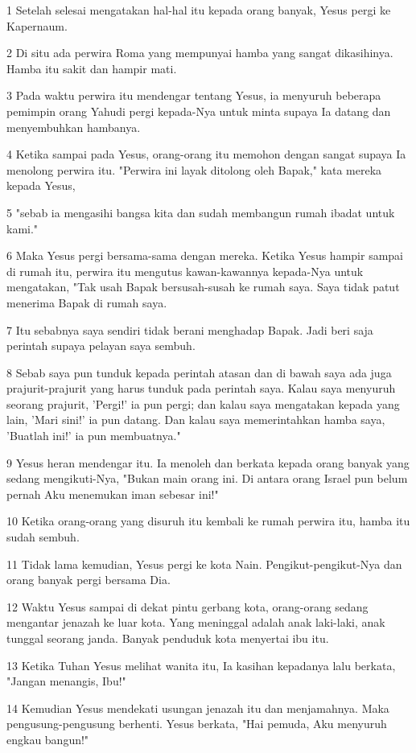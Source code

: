 \par 1 Setelah selesai mengatakan hal-hal itu kepada orang banyak, Yesus pergi ke Kapernaum.
\par 2 Di situ ada perwira Roma yang mempunyai hamba yang sangat dikasihinya. Hamba itu sakit dan hampir mati.
\par 3 Pada waktu perwira itu mendengar tentang Yesus, ia menyuruh beberapa pemimpin orang Yahudi pergi kepada-Nya untuk minta supaya Ia datang dan menyembuhkan hambanya.
\par 4 Ketika sampai pada Yesus, orang-orang itu memohon dengan sangat supaya Ia menolong perwira itu. "Perwira ini layak ditolong oleh Bapak," kata mereka kepada Yesus,
\par 5 "sebab ia mengasihi bangsa kita dan sudah membangun rumah ibadat untuk kami."
\par 6 Maka Yesus pergi bersama-sama dengan mereka. Ketika Yesus hampir sampai di rumah itu, perwira itu mengutus kawan-kawannya kepada-Nya untuk mengatakan, "Tak usah Bapak bersusah-susah ke rumah saya. Saya tidak patut menerima Bapak di rumah saya.
\par 7 Itu sebabnya saya sendiri tidak berani menghadap Bapak. Jadi beri saja perintah supaya pelayan saya sembuh.
\par 8 Sebab saya pun tunduk kepada perintah atasan dan di bawah saya ada juga prajurit-prajurit yang harus tunduk pada perintah saya. Kalau saya menyuruh seorang prajurit, 'Pergi!' ia pun pergi; dan kalau saya mengatakan kepada yang lain, 'Mari sini!' ia pun datang. Dan kalau saya memerintahkan hamba saya, 'Buatlah ini!' ia pun membuatnya."
\par 9 Yesus heran mendengar itu. Ia menoleh dan berkata kepada orang banyak yang sedang mengikuti-Nya, "Bukan main orang ini. Di antara orang Israel pun belum pernah Aku menemukan iman sebesar ini!"
\par 10 Ketika orang-orang yang disuruh itu kembali ke rumah perwira itu, hamba itu sudah sembuh.
\par 11 Tidak lama kemudian, Yesus pergi ke kota Nain. Pengikut-pengikut-Nya dan orang banyak pergi bersama Dia.
\par 12 Waktu Yesus sampai di dekat pintu gerbang kota, orang-orang sedang mengantar jenazah ke luar kota. Yang meninggal adalah anak laki-laki, anak tunggal seorang janda. Banyak penduduk kota menyertai ibu itu.
\par 13 Ketika Tuhan Yesus melihat wanita itu, Ia kasihan kepadanya lalu berkata, "Jangan menangis, Ibu!"
\par 14 Kemudian Yesus mendekati usungan jenazah itu dan menjamahnya. Maka pengusung-pengusung berhenti. Yesus berkata, "Hai pemuda, Aku menyuruh engkau bangun!"
